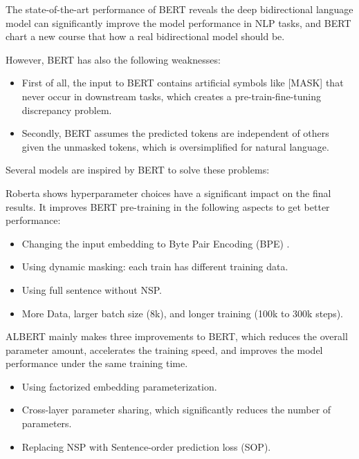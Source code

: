 \documentclass[]{krantz}
\providecommand{\tightlist}{%
  \setlength{\itemsep}{0pt}\setlength{\parskip}{0pt}}
\begin{document}
The state-of-the-art performance of BERT reveals the deep bidirectional language model can significantly improve the model performance in NLP tasks, and BERT chart a new course that how a real bidirectional model should be.

However, BERT has also the following weaknesses:

\begin{itemize}
\tightlist
\item
  First of all, the input to BERT contains artificial symbols like {[}MASK{]} that never occur in downstream tasks, which creates a pre-train-fine-tuning discrepancy problem.
\item
  Secondly, BERT assumes the predicted tokens are independent of others given the unmasked tokens, which is oversimplified for natural language.
\end{itemize}

Several models are inspired by BERT to solve these problems:

Roberta \citet{liu2019roberta} shows hyperparameter choices have a significant impact on the final results. It improves BERT pre-training in the following aspects to get better performance:

\begin{itemize}
\tightlist
\item
  Changing the input embedding to Byte Pair Encoding (BPE) \citet{sennrich2015neural}.
\item
  Using dynamic masking: each train has different training data.
\item
  Using full sentence without NSP.
\item
  More Data, larger batch size (8k), and longer training (100k to 300k steps).
\end{itemize}

ALBERT \citet{lan2019albert} mainly makes three improvements to BERT, which reduces the overall parameter amount, accelerates the training speed, and improves the model performance under the same training time.

\begin{itemize}
\tightlist
\item
  Using factorized embedding parameterization.
\item
  Cross-layer parameter sharing, which significantly reduces the number of parameters.
\item
  Replacing NSP with Sentence-order prediction loss (SOP).
\end{itemize}
\end{document}
